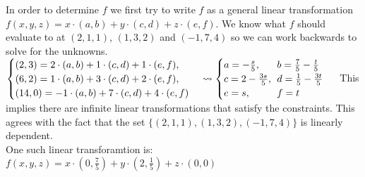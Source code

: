 \documentclass{article}
\begin{document}
In order to determine $f$ we first try to write $f$ as a general linear
transformation $f(x,y,z) = x \cdot (a, b) + y \cdot (c, d) + z \cdot (e, f)$. We know
what $f$ should evaluate to at $(2, 1, 1)$, $(1, 3, 2)$ and $(-1, 7, 4)$
so we can work backwards to solve for the unknowns. \vspace{0.2em} \\
$
\begin{cases}
  (2, 3) = 2 \cdot (a, b) + 1 \cdot (c, d) + 1 \cdot (e, f), \\
  (6, 2) = 1 \cdot (a, b) + 3 \cdot (c, d) + 2 \cdot (e, f), \\
  (14, 0) = -1 \cdot (a, b) + 7 \cdot (c, d) + 4 \cdot (e, f)
\end{cases}
\rightsquigarrow
\begin{cases}
  a = -\frac{s}{5}, \:\:\:\:\:\:\ b = \frac{7}{5} - \frac{t}{5} \\
  c = 2 - \frac{3s}{5}, \:\: d = \frac{1}{5} - \frac{3t}{5}  \\
  e = s, \:\:\:\:\:\:\:\:\:\:\:\: f = t \\
\end{cases} \vspace{0.2em}\\
$
This implies there are infinite linear transformations that satisfy the
constraints. This agrees with the fact that the set
$\{ (2, 1, 1), (1, 3, 2), (-1, 7, 4)\}$ is linearly dependent. \\ One such linear
transforamtion is:
$f(x,y,z) = x \cdot (0, \frac{7}{5}) + y \cdot (2, \frac{1}{5}) + z \cdot (0, 0)$
\end{document}
